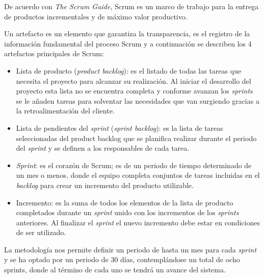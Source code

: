 De acuerdo con \textit{The Scrum Guide}\cite{the_scrum_guide_definitive_2020}, Scrum es un marco de trabajo para la entrega de productos incrementales y de máximo valor productivo.

Un artefacto es un elemento que garantiza la transparencia, es el registro de la información fundamental del proceso Scrum y a continuación se describen los 4 artefactos principales de Scrum:

\begin{itemize}
	\item Lista de producto (\textit{product backlog}):	es el listado de todas las tareas que necesita el proyecto para alcanzar su realización. Al iniciar el desarrollo del
	proyecto esta lista no se encuentra completa y conforme avanzan los \textit{sprints} se le añaden tareas para solventar las necesidades que	van surgiendo gracias a la retroalimentación del cliente.
	\item Lista de pendientes del \textit{sprint} (\textit{sprint backlog}): es la lista de tareas seleccionadas del product backlog que se planifica realizar durante el periodo del \textit{sprint} y se definen a los responsables de cada tarea.
	\item \textit{Sprint}: es el corazón de Scrum; es de un periodo de tiempo determinado de un mes o menos, donde el equipo completa conjuntos de tareas incluidas en el \textit{backlog} para crear un incremento del producto utilizable.
	\item Incremento: es la suma de todos los elementos de la lista de producto completados durante un \textit{sprint} unido con los incrementos de los \textit{sprints} anteriores. Al finalizar el \textit{sprint} el nuevo incremento debe estar en condiciones de ser utilizado.
\end{itemize}

La metodología nos permite definir un periodo de hasta un mes para cada \textit{sprint} y se ha optado por un periodo de 30 días, contemplándose un total de ocho sprints, donde al término de cada uno se tendrá un avance del sistema.

